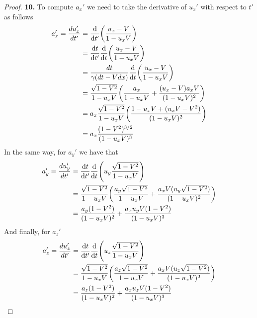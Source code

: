 \documentclass[11pt]{article}
\theoremstyle{definition}
\begin{document}
\cleardoublepage
\begin{proof}{\textbf{10.}}
To compute $a_x'$ we need to take the derivative of $u_x'$ with respect to $t'$
as follows
\begin{align*}
    a_x' = \frac{du_x'}{dt'}
    &= \dv{t'}(\frac{u_x - V}{1 - u_x V})\\
    &= \dv{t}{t'}\dv{t}(\frac{u_x - V}{1 - u_x V})\\
    &= \frac{dt}{\gamma (dt - Vdx)}\dv{t}(\frac{u_x - V}{1 - u_x V})\\
    &= \frac{\sqrt{1 - V^2}}{1 - u_xV}
    \bigg(\frac{a_x}{1 - u_x V} + \frac{(u_x - V)a_xV}{(1 - u_xV)^2}\bigg)\\
    &= a_x\frac{\sqrt{1 - V^2}}{1 - u_xV}
    \bigg(\frac{1 - u_xV + (u_xV - V^2)}{(1 - u_xV)^2}\bigg)\\
    &= a_x\frac{(1 - V^2)^{3/2}}{(1 - u_xV)^3}
\end{align*}
In the same way, for $a_y'$ we have that
\begin{align*}
    a_y' = \frac{du_y'}{dt'}
    &= \dv{t}{t'}\dv{t}(u_y\frac{\sqrt{1 - V^2}}{1 - u_x V})\\
    &= \frac{\sqrt{1 - V^2}}{1 - u_xV}
    \bigg(\frac{a_y\sqrt{1 - V^2}}{1 - u_x V}
    + \frac{a_xV (u_y\sqrt{1 - V^2})}{(1 - u_xV)^2}\bigg)\\
    &= \frac{a_y(1 - V^2)}{(1 - u_x V)^2}
    + \frac{a_xu_yV(1 - V^2)}{(1 - u_xV)^3}
\end{align*}
And finally, for $a_z'$
\begin{align*}
    a_z' = \frac{du_z'}{dt'}
    &= \dv{t}{t'}\dv{t}(u_z\frac{\sqrt{1 - V^2}}{1 - u_x V})\\
    &= \frac{\sqrt{1 - V^2}}{1 - u_xV}
    \bigg(\frac{a_z\sqrt{1 - V^2}}{1 - u_x V}
    + \frac{a_xV (u_z\sqrt{1 - V^2})}{(1 - u_xV)^2}\bigg)\\
    &= \frac{a_z(1 - V^2)}{(1 - u_x V)^2}
    + \frac{a_xu_zV(1 - V^2)}{(1 - u_xV)^3}
\end{align*}
\end{proof}
\end{document}
